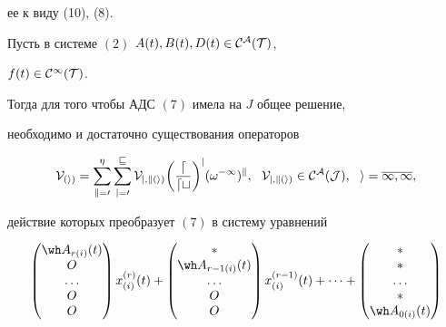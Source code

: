 ее к виду (10), (8).





\begin{thm}


Пусть в системе $(2)$ $A(t),B(t),D(t) \in \cal C^A(T)$,


$f(t) \in \cal C^{\infty}(T)$.





Тогда для того чтобы АДС $(7)$ имела на $J$ общее решение,


необходимо и достаточно существования операторов


\begin{equation}


\cal V_{(i)}=\sum_{k=0}^{\eta}{ \sum_{j=0}^{v}{V_{j,k(i)}


\bigg( \frac{d}{dt}\bigg)^j


(\omega^{-1})^k}},


\ \ V_{j,k(i)} \in \cal C^A(J), \ \ i=\overline{1,\infty},


\end{equation}


действие которых преобразует $(7)$ в систему уравнений


\begin{gather}




\begin{pmatrix}


\wh A_{r(i)}(t) \\ O \\ \dotsc \\ O \\ O 


\end{pmatrix} x_{(i)}^{(r)}(t)+


\begin{pmatrix}


\ast \\ \wh A_{r-1(i)}(t) \\ \dotsc \\ O \\ O 


\end{pmatrix} x_{(i)}^{(r-1)}(t)+ \dotsb +


\begin{pmatrix}


\ast \\ \ast \\ \dotsc \\ \ast \\ \wh A_{0(i)}(t) 



\end{pmatrix}
\end{gather}
\end{thm}
